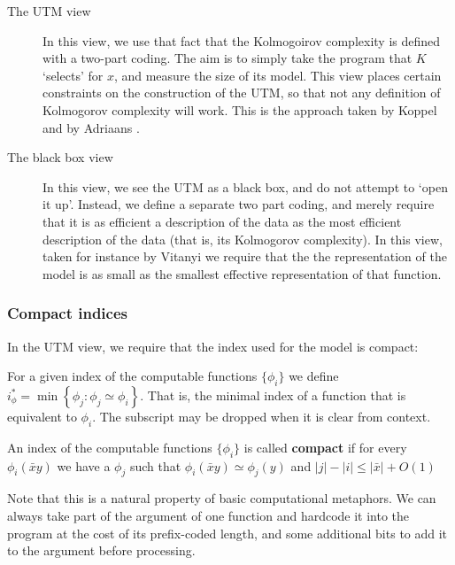 \documentclass{style/llncs}
\begin{document}
\begin{description}
\item[The UTM view] In this view, we use that fact that the Kolmogoirov complexity is defined with a two-part coding. The aim is to simply take the program that $K$ `selects' for $x$, and measure the size of its model. This view places certain constraints on the construction of the UTM, so that not any definition of Kolmogorov complexity will work. This is the approach taken by Koppel \cite{koppelSoph1988} and by Adriaans \cite{adriaans2012facticity}. 
\item[The black box view] In this view, we see the UTM as a black box, and do not attempt to `open it up'. Instead, we define a separate two part coding, and merely require that it is as efficient a description of the data as the most efficient description of the data (that is, its Kolmogorov complexity). In this view, taken for instance by Vitanyi\cite{vitanyi2006meaningful} we require that the the representation of the model is as small as the smallest effective representation of that function.
\end{description}

\subsubsection{Compact indices}
In the UTM view, we require that the index used for the model is compact:

\begin{definition}
For a given index of the computable functions $\{\phi_i\}$ we define $i^*_\phi = \min\left\{\phi_j : \phi_j \simeq \phi_i\right\}$. That is, the minimal index of a function that is equivalent to $\phi_i$. The subscript may be dropped when it is clear from context.
\end{definition}

\begin{definition}
An index of the computable functions $\{\phi_i\}$ is called \textbf{compact} if for every 
$\phi_i(\bar{x}y)$ we have a $\phi_j$ such that $\phi_i(\bar{x}y) \simeq \phi_j(y)$ and  $|j| - |i| \leq |\bar{x}| + O(1)$
\end{definition}

Note that this is a natural property of basic computational metaphors. We can always take part of the argument of one function and hardcode it into the program at the cost of its prefix-coded length, and some additional bits to add it to the argument before processing. 
\end{document}
